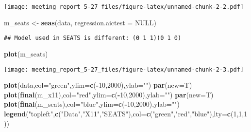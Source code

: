 \documentclass[]{article}
\newenvironment{Shaded}{\begin{snugshade}}{\end{snugshade}}
\newcommand{\DataTypeTok}[1]{\textcolor[rgb]{0.13,0.29,0.53}{#1}}
\newcommand{\DecValTok}[1]{\textcolor[rgb]{0.00,0.00,0.81}{#1}}
\newcommand{\KeywordTok}[1]{\textcolor[rgb]{0.13,0.29,0.53}{\textbf{#1}}}
\newcommand{\NormalTok}[1]{#1}
\newcommand{\OperatorTok}[1]{\textcolor[rgb]{0.81,0.36,0.00}{\textbf{#1}}}
\newcommand{\OtherTok}[1]{\textcolor[rgb]{0.56,0.35,0.01}{#1}}
\newcommand{\StringTok}[1]{\textcolor[rgb]{0.31,0.60,0.02}{#1}}
\begin{document}
\texttt{[image: meeting\_report\_5-27\_files/figure-latex/unnamed-chunk-2-2.pdf]}

\begin{Shaded}
\begin{Highlighting}[]
\NormalTok{m_seats <-}\StringTok{ }\KeywordTok{seas}\NormalTok{(data, }\DataTypeTok{regression.aictest =} \OtherTok{NULL}\NormalTok{)}
\end{Highlighting}
\end{Shaded}

\begin{verbatim}
## Model used in SEATS is different: (0 1 1)(0 1 0)
\end{verbatim}

\begin{Shaded}
\begin{Highlighting}[]
\KeywordTok{plot}\NormalTok{(m_seats)}
\end{Highlighting}
\end{Shaded}

\texttt{[image: meeting\_report\_5-27\_files/figure-latex/unnamed-chunk-2-3.pdf]}

\begin{Shaded}
\begin{Highlighting}[]
\KeywordTok{plot}\NormalTok{(data,}\DataTypeTok{col=}\StringTok{"green"}\NormalTok{,}\DataTypeTok{ylim=}\KeywordTok{c}\NormalTok{(}\OperatorTok{-}\DecValTok{10}\NormalTok{,}\DecValTok{2000}\NormalTok{),}\DataTypeTok{ylab=}\StringTok{""}\NormalTok{)}
\KeywordTok{par}\NormalTok{(}\DataTypeTok{new=}\NormalTok{T)}
\KeywordTok{plot}\NormalTok{(}\KeywordTok{final}\NormalTok{(m_x11),}\DataTypeTok{col=}\StringTok{"red"}\NormalTok{,}\DataTypeTok{ylim=}\KeywordTok{c}\NormalTok{(}\OperatorTok{-}\DecValTok{10}\NormalTok{,}\DecValTok{2000}\NormalTok{),}\DataTypeTok{ylab=}\StringTok{""}\NormalTok{)}
\KeywordTok{par}\NormalTok{(}\DataTypeTok{new=}\NormalTok{T)}
\KeywordTok{plot}\NormalTok{(}\KeywordTok{final}\NormalTok{(m_seats),}\DataTypeTok{col=}\StringTok{"blue"}\NormalTok{,}\DataTypeTok{ylim=}\KeywordTok{c}\NormalTok{(}\OperatorTok{-}\DecValTok{10}\NormalTok{,}\DecValTok{2000}\NormalTok{),}\DataTypeTok{ylab=}\StringTok{""}\NormalTok{)}
\KeywordTok{legend}\NormalTok{(}\StringTok{"topleft"}\NormalTok{,}\KeywordTok{c}\NormalTok{(}\StringTok{"Data"}\NormalTok{,}\StringTok{"X11"}\NormalTok{,}\StringTok{"SEATS"}\NormalTok{),}\DataTypeTok{col=}\KeywordTok{c}\NormalTok{(}\StringTok{"green"}\NormalTok{,}\StringTok{"red"}\NormalTok{,}\StringTok{"blue"}\NormalTok{),}\DataTypeTok{lty=}\KeywordTok{c}\NormalTok{(}\DecValTok{1}\NormalTok{,}\DecValTok{1}\NormalTok{,}\DecValTok{1}\NormalTok{))}
\end{Highlighting}
\end{Shaded}
\end{document}
